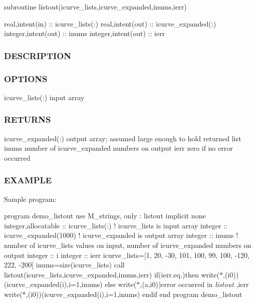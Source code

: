 subroutine listout(icurve\+\_\+lists,icurve\+\_\+expanded,inums,ierr)

real,intent(in) \+:\+: icurve\+\_\+lists(\+:) real,intent(out) \+:\+: icurve\+\_\+expanded(\+:) integer,intent(out) \+:\+: inums integer,intent(out) \+:\+: ierr

\subsubsection*{D\+E\+S\+C\+R\+I\+P\+T\+I\+ON}

\subsubsection*{O\+P\+T\+I\+O\+NS}

icurve\+\_\+lists(\+:) input array

\subsubsection*{R\+E\+T\+U\+R\+NS}

icurve\+\_\+expanded(\+:) output array; assumed large enough to hold returned list inums number of icurve\+\_\+expanded numbers on output ierr zero if no error occurred

\subsubsection*{E\+X\+A\+M\+P\+LE}

Sample program\+:

program demo\+\_\+listout use M\+\_\+strings, only \+: listout implicit none integer,allocatable \+:\+: icurve\+\_\+lists(\+:) ! icurve\+\_\+lists is input array integer \+:\+: icurve\+\_\+expanded(1000) ! icurve\+\_\+expanded is output array integer \+:\+: inums ! number of icurve\+\_\+lists values on input, number of icurve\+\_\+expanded numbers on output integer \+:\+: i integer \+:\+: ierr icurve\+\_\+lists=\mbox{[}1, 20, -\/30, 101, 100, 99, 100, -\/120, 222, -\/200\mbox{]} inums=size(icurve\+\_\+lists) call listout(icurve\+\_\+lists,icurve\+\_\+expanded,inums,ierr) if(ierr.\+eq.)then write($\ast$,\textquotesingle{}(i0)\textquotesingle{})(icurve\+\_\+expanded(i),i=1,inums) else write($\ast$,\textquotesingle{}(a,i0)\textquotesingle{})\textquotesingle{}error occurred in {\itshape listout} \textquotesingle{},ierr write($\ast$,\textquotesingle{}(i0)\textquotesingle{})(icurve\+\_\+expanded(i),i=1,inums) endif end program demo\+\_\+listout \mbox{\label{namespacem__strings_a3c7d4be9051206e4b2f72112f9fdc3b4}} 
